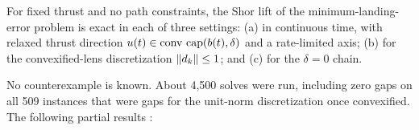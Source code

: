 \begin{conjecture}[CSD2$'$]\label{conj:csd2p}
For fixed thrust and no path constraints, the Shor lift of the minimum-landing-error problem is exact in each of three
settings: (a) in continuous time, with relaxed thrust direction $u(t)\in\operatorname{conv}\,\mathrm{cap}(b(t),\delta)$ and a rate-limited axis;
(b) for the convexified-lens discretization $\lVert d_k\rVert\le1$; and (c) for the $\delta=0$ chain.\Sopen
\end{conjecture}
No counterexample is known. About 4{,}500 solves were run, including zero gaps on all 509 instances that were gaps for the
unit-norm discretization once convexified. The following partial results 
:
